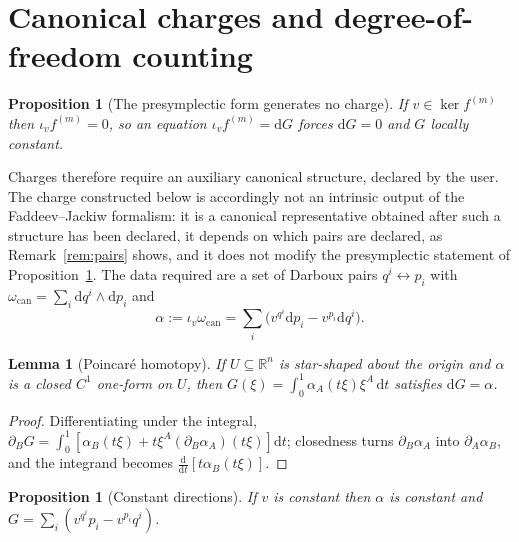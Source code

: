 \documentclass[12pt]{article}
\theoremstyle{plain}
\newtheorem{proposition}[theorem]{Proposition}
\newtheorem{lemma}[theorem]{Lemma}
\theoremstyle{definition}
\theoremstyle{remark}
\newcommand{\R}{\mathbb{R}}
\newcommand{\dd}{\mathrm{d}}
\newcommand{\pd}[1]{\partial_{#1}}
\begin{document}
	\section{Canonical charges and degree-of-freedom counting}
	\label{sec:charges}
	
	\begin{proposition}[The presymplectic form generates no charge]
		\label{prop:nocharge}
		If $v\in\ker f^{(m)}$ then $\iota_{v}f^{(m)}=0$, so an equation
		$\iota_{v}f^{(m)}=\dd G$ forces $\dd G=0$ and $G$ locally constant.
	\end{proposition}
	
	Charges therefore require an auxiliary canonical structure, declared by the
	user. The charge constructed below is accordingly not an intrinsic output of
	the Faddeev--Jackiw formalism: it is a canonical representative obtained after
	such a structure has been declared, it depends on which pairs are declared, as
	Remark~\ref{rem:pairs} shows, and it does not modify the presymplectic
	statement of Proposition~\ref{prop:nocharge}. The data required are a set of
	Darboux pairs $q^{i}\leftrightarrow p_{i}$ with
	$\omega_{\mathrm{can}}=\sum_{i}\dd q^{i}\wedge\dd p_{i}$ and
	\begin{equation}
		\alpha:=\iota_{v}\omega_{\mathrm{can}}
		=\sum_{i}\bigl(v^{q^{i}}\dd p_{i}-v^{p_{i}}\dd q^{i}\bigr).
		\label{eq:alpha}
	\end{equation}
	
	\begin{lemma}[Poincar\'e homotopy]
		\label{lem:poincare}
		If $U\subseteq\R^{n}$ is star-shaped about the origin and $\alpha$ is a closed
		$C^{1}$ one-form on $U$, then
		$G(\xi)=\int_{0}^{1}\alpha_{A}(t\xi)\xi^{A}\,\dd t$ satisfies $\dd G=\alpha$.
	\end{lemma}
	
	\begin{proof}
		Differentiating under the integral,
		$\pd{B}G=\int_{0}^{1}[\alpha_{B}(t\xi)+t\xi^{A}(\pd{B}\alpha_{A})(t\xi)]\dd t$;
		closedness turns $\pd{B}\alpha_{A}$ into $\pd{A}\alpha_{B}$, and the integrand
		becomes $\tfrac{\dd}{\dd t}[t\alpha_{B}(t\xi)]$.
	\end{proof}
	
	\begin{proposition}[Constant directions]
		If $v$ is constant then $\alpha$ is constant and
		$G=\sum_{i}(v^{q^{i}}p_{i}-v^{p_{i}}q^{i})$.
	\end{proposition}
	
\end{document}
